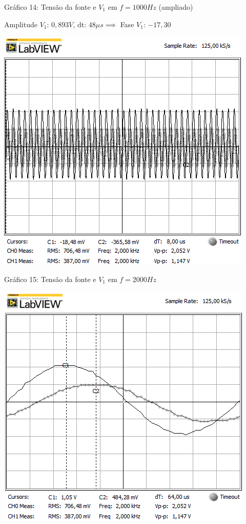 \begin{center}
Gráfico 14: Tensão da fonte e $V_1$ em $f=1000Hz$ (ampliado)
\end{center}

Amplitude $V_1$: $0,893V$, dt: $48\mu s\implies$ Fase $V_1$: $-17,30$\textdegree

\newpage
\begin{table}[h]
\centering
\includegraphics[scale=0.725]{rgadicoas/rgadicoa4}
\end{table}

\begin{center}
Gráfico 15: Tensão da fonte e $V_1$ em $f=2000Hz$ 
\end{center}

\begin{table}[h]
\centering
\includegraphics[scale=0.725]{rgadicoas/rgadicoa4-2}
\end{table}

